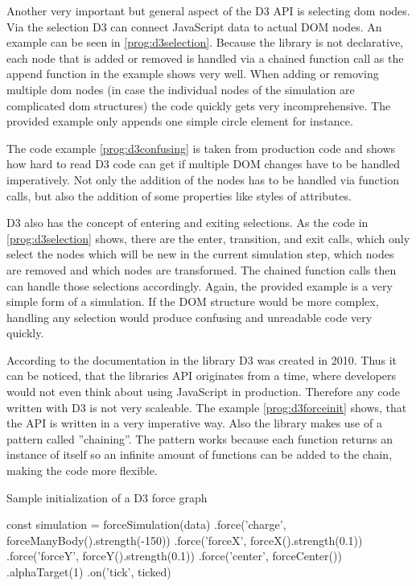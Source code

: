 Another very important but general aspect of the D3 API is selecting dom nodes. Via the selection D3 can connect JavaScript data to actual DOM nodes. An example can be seen in \ref{prog:d3selection}. Because the library is not declarative, each node that is added or removed is handled via a chained function call as the append function in the example shows very well. When adding or removing multiple dom nodes (in case the individual nodes of the simulation are complicated dom structures) the code quickly gets very incomprehensive. The provided example only appends one simple circle element for instance. 

The code example \ref{prog:d3confusing} is taken from production code and shows how hard to read D3 code can get if multiple DOM changes have to be handled imperatively. Not only the addition of the nodes has to be handled via function calls, but also the addition of some properties like styles of attributes.

D3 also has the concept of entering and exiting selections. As the code in \ref{prog:d3selection} shows, there are the enter, transition, and exit calls, which only select the nodes which will be new in the current simulation step, which nodes are removed and which nodes are transformed. The chained function calls then can handle those selections accordingly. Again, the provided example is a very simple form of a simulation. If the DOM structure would be more complex, handling any selection would produce confusing and unreadable code very quickly.

According to the documentation in \cite{D3Github} the library D3 was created in 2010. Thus it can be noticed, that the libraries API originates from a time, where developers would not even think about using JavaScript in production. Therefore any code written with D3 is not very scaleable. The example \ref{prog:d3forceinit} shows, that the API is written in a very imperative way. Also the library makes use of a pattern called ''chaining''. The pattern works because each function returns an instance of itself so an infinite amount of functions can be added to the chain, making the code more flexible.

\begin{program}
\caption{Sample initialization of a D3 force graph}
\label{prog:d3forceinit}
\begin{JsCode}
const simulation = forceSimulation(data)
  .force('charge', forceManyBody().strength(-150))
  .force('forceX', forceX().strength(0.1))
  .force('forceY', forceY().strength(0.1))
  .force('center', forceCenter())
  .alphaTarget(1)
  .on('tick', ticked)
\end{JsCode}
\end{program}

